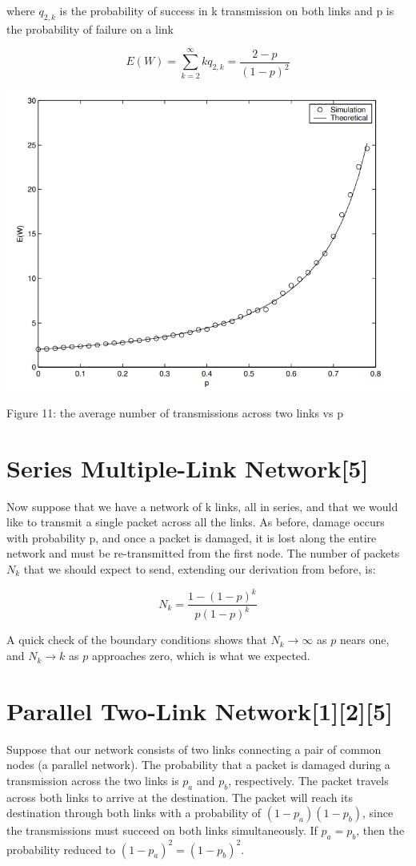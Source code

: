 \documentclass[10pt,twocolumn,letterpaper]{article}
\begin{document}
where $q_{2,k}$ is the probability of success in k transmission on both links and p is the probability of failure on a link

$$ E(W) = \sum_{k=2}^{\infty} k q_{2,k} = \frac{2-p}{(1-p)^2} $$

\includegraphics[width=\linewidth]{plots/fig11.PNG}
\caption{Figure 11: the average number of transmissions across two links vs p}


\section*{Series Multiple-Link Network{\small[5]}}

Now suppose that we have a network of k links, all in series, and that we would like to transmit a single packet across all the links. As before, damage occurs with probability p, and once a packet is damaged, it is lost along the entire network and must be re-transmitted from the first node. The number of packets $N_k$ that we should expect to send, extending our derivation from before, is:

$$ N_k = \frac{1-(1-p)^k}{p (1-p)^k} $$

A quick check of the boundary conditions shows that $N_k \to \infty$ as $p$ nears one, and $N_k \to k$ as $p$ approaches zero, which is what we expected.

\section*{Parallel Two-Link Network{\small[1][2][5]}}

Suppose that our network consists of two links connecting a pair of common nodes (a parallel network). The probability that a packet is damaged during a transmission across the two links is $p_a$ and $p_b$, respectively. The packet travels across both links to arrive at the destination. The packet will reach its destination through both links with a probability of $(1-p_a)(1-p_b)$, since the transmissions must succeed on both links simultaneously. If $p_a=p_b$, then the probability reduced to $(1-p_a)^2=(1-p_b)^2$.
\end{document}
